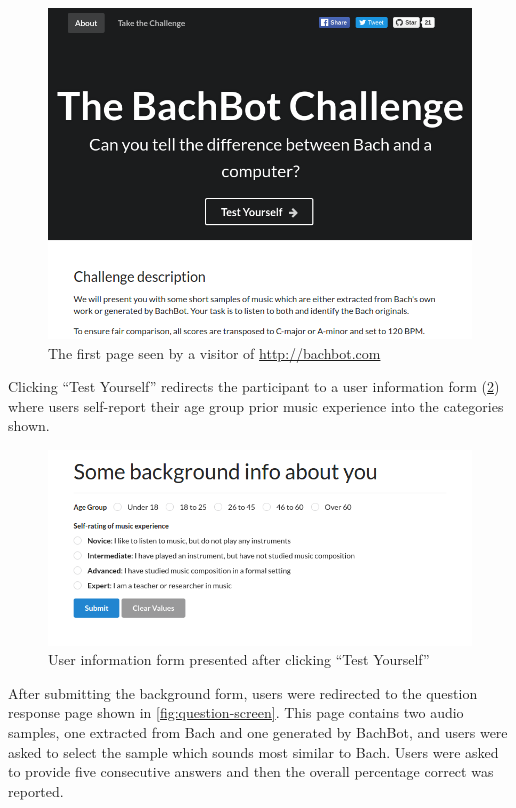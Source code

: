 \begin{figure}[htpb]
  \centering
  \includegraphics[width=1.0\linewidth]{bachbot-front-page.png}
  \caption{The first page seen by a visitor of \url{http://bachbot.com}}
  \label{fig:bachbot-front-page}
\end{figure}

Clicking ``Test Yourself'' redirects the participant to a user information form
(\cref{fig:user-info-form}) where users self-report their age
group prior music experience into the categories shown.

\begin{figure}[htpb]
  \centering
  \includegraphics[width=1.0\linewidth]{user-info-form.png}
  \caption{User information form presented after clicking ``Test Yourself''}
  \label{fig:user-info-form}
\end{figure}

After submitting the background form, users were redirected to the question
response page shown in \cref{fig:question-screen}. This page contains two
audio samples, one extracted from Bach and one generated by BachBot, and users
were asked to select the sample which sounds most similar to Bach. Users were
asked to provide five consecutive answers and then the overall percentage
correct was reported.

